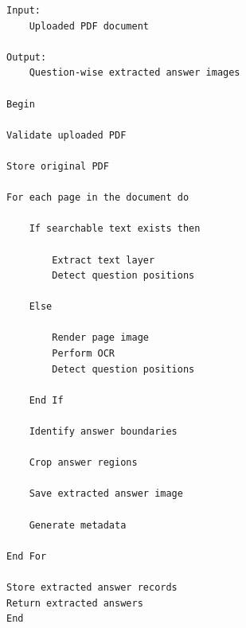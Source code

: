 \begin{verbatim}
Input:
    Uploaded PDF document

Output:
    Question-wise extracted answer images

Begin

Validate uploaded PDF

Store original PDF

For each page in the document do

    If searchable text exists then

        Extract text layer
        Detect question positions

    Else

        Render page image
        Perform OCR
        Detect question positions

    End If

    Identify answer boundaries

    Crop answer regions

    Save extracted answer image

    Generate metadata

End For

Store extracted answer records
Return extracted answers
End
\end{verbatim}

